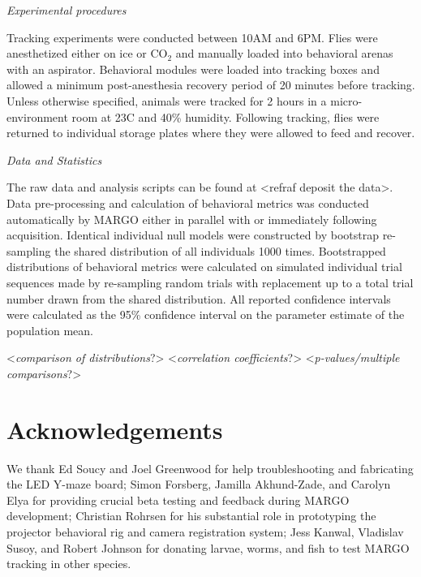 \documentclass[10pt]{article}
\begin{document}
\begin{multicols}{2}
\vspace*{0.5cm}
\noindent\textit{Experimental procedures}
\vspace*{0.3cm}

Tracking experiments were conducted between 10AM and 6PM. Flies were anesthetized either on ice or CO$_{2}$ and manually loaded into behavioral arenas with an aspirator. Behavioral modules were loaded into tracking boxes and allowed a minimum post-anesthesia recovery period of 20 minutes before tracking. Unless otherwise specified, animals were tracked for 2 hours in a micro-environment room at 23\degree  C and 40\% humidity. Following tracking, flies were returned to individual storage plates where they were allowed to feed and recover.

\vspace*{0.5cm}
\noindent\textit{Data and Statistics}
\vspace*{0.3cm}

The raw data and analysis scripts can be found at <refraf deposit the data>. Data pre-processing and calculation of behavioral metrics was conducted automatically by MARGO either in parallel with or immediately following acquisition. Identical individual null models were constructed by bootstrap re-sampling the shared distribution of all individuals 1000 times. Bootstrapped distributions of behavioral metrics were calculated on simulated individual trial sequences made by re-sampling random trials with replacement up to a total trial number drawn from the shared distribution. All reported confidence intervals were calculated as the 95\% confidence interval on the parameter estimate of the population mean.

<\textit{comparison of distributions}?>
<\textit{correlation coefficients}?>
<\textit{p-values/multiple comparisons}?>

\section*{Acknowledgements}

We thank Ed Soucy and Joel Greenwood for help troubleshooting and fabricating the LED Y-maze board; Simon Forsberg, Jamilla Akhund-Zade, and Carolyn Elya for providing crucial beta testing and feedback during MARGO development; Christian Rohrsen for his substantial role in prototyping the projector behavioral rig and camera registration system; Jess Kanwal, Vladislav Susoy, and Robert Johnson for donating larvae, worms, and fish to test MARGO tracking in other species.

 
\end{multicols}
\end{document}
